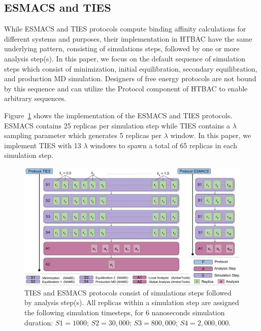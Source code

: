 
\subsection{ESMACS and TIES}


While ESMACS and TIES protocols compute binding affinity calculations for
different systems and purposes, their implementation in HTBAC have the same
underlying pattern, consisting of simulations steps, followed by one or more
analysis step(s). In this paper, we focus on the default sequence of
simulation steps which consist of minimization, initial equilibration,
secondary equilibration, and production MD simulation. Designers of free
energy protocols are not bound by this sequence and can utilize the Protocol
component of HTBAC to enable arbitrary sequences. 

Figure~\ref{fig:ties_esmacs_application} shows the implementation of the
ESMACS and TIES protocols. ESMACS contains 25 replicas per simulation step
while TIES contains a $\lambda$ sampling parameter which generates 5 replicas
per $\lambda$ window. In this paper, we implement TIES with 13 $\lambda$
windows to spawn a total of 65 replicas in each simulation step.

\begin{figure}
  \centering
  \includegraphics[width=\columnwidth]{figures/ties_esmacs_application_model.pdf}
  \captionsetup{singlelinecheck=off}
  \caption[]{TIES and ESMACS protocols consist of simulations steps followed
  by analysis step(s). All replicas within a simulation step are assigned the
  following simulation timesteps, for 6 nanoseconds simulation duration:
  $S1=1000$; $S2=30,000$; $S3=800,000$; $S4=2,000,000$.}
\label{fig:ties_esmacs_application}
\end{figure}

